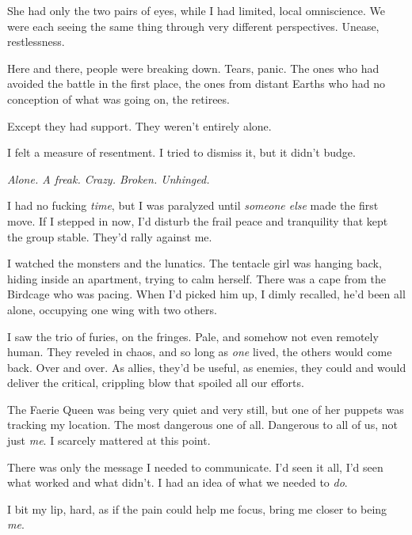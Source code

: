 She had only the two pairs of eyes, while I had limited, local omniscience.  We were each seeing the same thing through very different perspectives.  Unease, restlessness.



Here and there, people were breaking down.  Tears, panic.  The ones who had avoided the battle in the first place, the ones from distant Earths who had no conception of what was going on, the retirees.



Except they had support.  They weren't entirely alone.



I felt a measure of resentment.  I tried to dismiss it, but it didn't budge.



\emph{Alone.  A freak.  Crazy.  Broken.  Unhinged.}



I had no fucking \emph{time}, but I was paralyzed until \emph{someone else} made the first move.  If I stepped in now, I'd disturb the frail peace and tranquility that kept the group stable.  They'd rally against me.



I watched the monsters and the lunatics.  The tentacle girl was hanging back, hiding inside an apartment, trying to calm herself.  There was a cape from the Birdcage who was pacing.  When I'd picked him up, I dimly recalled, he'd been all alone, occupying one wing with two others.



I saw the trio of furies, on the fringes.  Pale, and somehow not even remotely human.  They reveled in chaos, and so long as \emph{one} lived, the others would come back.  Over and over.  As allies, they'd be useful, as enemies, they could and would deliver the critical, crippling blow that spoiled all our efforts.



The Faerie Queen was being very quiet and very still, but one of her puppets was tracking my location.  The most dangerous one of all.  Dangerous to all of us, not just \emph{me}.  I scarcely mattered at this point.



There was only the message I needed to communicate.  I'd seen it all, I'd seen what worked and what didn't.  I had an idea of what we needed to \emph{do}.



I bit my lip, hard, as if the pain could help me focus, bring me closer to being \emph{me}.



